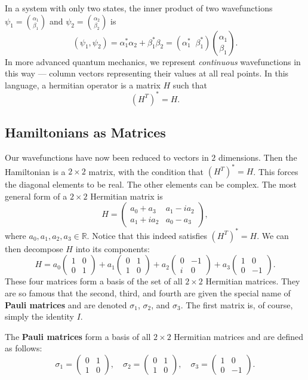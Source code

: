 In a system with only two states, the inner product of two wavefunctions $\psi_1={\alpha_1\choose\beta_1}$ and $\psi_2={\alpha_2\choose\beta_2}$ is $$(\psi_1,\psi_2)=\alpha_1^*\alpha_2+\beta_1^*\beta_2=(\alpha_1^*\;\;\beta_1^*){\alpha_1\choose\beta_1}.$$In more advanced quantum mechanics, we represent \textit{continuous} wavefunctions in this way --- column vectors representing their values at all real points. In this language, a hermitian operator is a matrix $H$ such that $$(H^T)^*=H.$$

\subsection{Hamiltonians as Matrices}\label{hamiltonians_as_matrices}

Our wavefunctions have now been reduced to vectors in $2$ dimensions. Then the Hamiltonian is a $2\times2$ matrix, with the condition that $(H^T)^*=H$. This forces the diagonal elements to be real. The other elements can be complex. The most general form of a $2\times2$ Hermitian matrix is $$H=\begin{pmatrix}a_0+a_3 & a_1-ia_2 \\ a_1+ia_2 & a_0-a_3\end{pmatrix},$$where $a_0,a_1,a_2,a_3\in\mathbb{R}$. Notice that this indeed satisfies $(H^T)^*=H$. We can then decompose $H$ into its components: $$H=a_0\begin{pmatrix}1&0\\0&1\end{pmatrix}+a_1\begin{pmatrix}0&1\\1&0\end{pmatrix}+a_2\begin{pmatrix}0&-1\\i&0\end{pmatrix}+a_3\begin{pmatrix}1&0\\0&-1\end{pmatrix}.$$These four matrices form a basis of the set of all $2\times 2$ Hermitian matrices. They are so famous that the second, third, and fourth are given the special name of \textbf{Pauli matrices} and are denoted $\sigma_1$, $\sigma_2$, and $\sigma_3$. The first matrix is, of course, simply the identity $I$.

\begin{frameddefn}
    The \textbf{Pauli matrices} form a basis of all $2\times2$ Hermitian matrices and are defined as follows: $$\sigma_1=\begin{pmatrix}0&1\\1&0\end{pmatrix},\quad\sigma_2=\begin{pmatrix}0&1\\1&0\end{pmatrix},\quad\sigma_3=\begin{pmatrix}1&0\\0&-1\end{pmatrix}.$$
\end{frameddefn}

